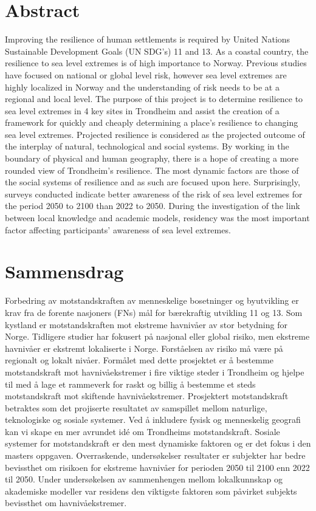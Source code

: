 

\section{Abstract}

Improving the resilience of human settlements is required by United Nations Sustainable Development Goals (UN SDG's) 11 and 13. As a coastal country, the resilience to sea level extremes is of high importance to Norway. Previous studies have focused on national or global level risk, however sea level extremes are highly localized in Norway and the understanding of risk needs to be at a regional and local level. The purpose of this project is to determine resilience to sea level extremes in 4 key sites in Trondheim and assist the creation of a framework for quickly and cheaply determining a place's resilience to changing sea level extremes. Projected resilience is considered as the projected outcome of the interplay of natural, technological and social systems. By working in the boundary of physical and human geography, there is a hope of creating a more rounded view of Trondheim's resilience. The most dynamic factors are those of the social systems of resilience and as such are focused upon here. Surprisingly, surveys conducted indicate better awareness of the risk of sea level extremes for the period 2050 to 2100 than 2022 to 2050. During the investigation of the link between local knowledge and academic models, residency was the most important factor affecting participants' awareness of sea level extremes.   

\newpage

\section{Sammensdrag}
Forbedring av motstandskraften av menneskelige bosetninger og byutvikling er krav fra de forente nasjoners (FNs) mål for bærekraftig utvikling 11 og 13. Som kystland er motstandskraften mot ekstreme havnivåer av stor betydning for Norge. Tidligere studier har fokusert på nasjonal eller global risiko, men ekstreme havnivåer er ekstremt lokaliserte i Norge. Forståelsen av risiko må være på regionalt og lokalt nivåer. Formålet med dette prosjektet er å bestemme motstandskraft mot havnivåekstremer i fire viktige steder i Trondheim og hjelpe til med å lage et rammeverk for raskt og billig å bestemme et steds motstandskraft mot skiftende havnivåekstremer. Prosjektert motstandskraft betraktes som det projiserte resultatet av samspillet mellom naturlige, teknologiske og sosiale systemer. Ved å inkludere fysisk og menneskelig geografi kan vi skape en mer avrundet idé om Trondheims motstandskraft.
Sosiale systemer for motstandskraft er den mest dynamiske faktoren og er det fokus i den masters oppgaven. Overraskende, undersøkelser resultater er subjekter har bedre bevissthet om risikoen for ekstreme havnivåer for perioden 2050 til 2100 enn 2022 til 2050. Under undersøkelsen av sammenhengen mellom lokalkunnskap og akademiske modeller var residens den viktigste faktoren som påvirket subjekts bevissthet om havnivåekstremer.